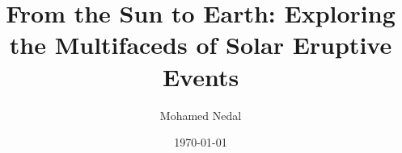 \documentclass[12pt,letterpaper]{report}
\begin{document}
\title{From the Sun to Earth: Exploring the Multifaceds of Solar Eruptive Events}
\author{Mohamed Nedal}
\date{\today}

\tableofcontents





%
%



\end{document}
